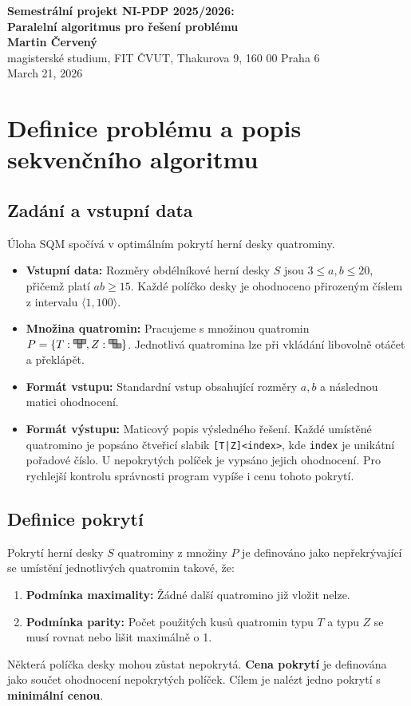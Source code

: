 \documentclass[11pt,a4paper]{article}
\newcommand{\quatZ}{\begin{tikzpicture}[scale=0.13,baseline=0pt]
    \foreach \x/\y in {0/1, 1/1, 1/0, 2/0} 
        \draw[fill=gray!70] (\x,\y) rectangle (\x+1,\y+1);
\end{tikzpicture}}
\newcommand{\quatT}{\begin{tikzpicture}[scale=0.13,baseline=0pt]
    \foreach \x/\y in {0/1, 1/1, 2/1, 1/0} 
        \draw[fill=gray!70] (\x,\y) rectangle (\x+1,\y+1);
\end{tikzpicture}}
\begin{document}
\begin{center}
    \textbf{Semestrální projekt NI-PDP 2025/2026:} \\[0.5em]
    \textbf{Paralelní algoritmus pro řešení problému} \\[1.5em]
    \textbf{Martin Červený} \\
    magisterské studium, FIT ČVUT, Thakurova 9, 160 00 Praha 6 \\
    March 21, 2026
\end{center}

\section{Definice problému a popis sekvenčního algoritmu}
\subsection{Zadání a vstupní data}
Úloha SQM spočívá v optimálním pokrytí herní desky quatrominy.
\begin{itemize}
    \item \textbf{Vstupní data:} Rozměry obdélníkové herní desky $S$ jsou $3 \le a, b \le 20$, přičemž platí $ab \ge 15$. Každé políčko desky je ohodnoceno přirozeným číslem z intervalu $\langle 1, 100 \rangle$.
    \item \textbf{Množina quatromin:} Pracujeme s množinou quatromin $P = \{T: \quatT, Z: \quatZ \}$. Jednotlivá quatromina lze při vkládání libovolně otáčet a překlápět.
    \item \textbf{Formát vstupu:} Standardní vstup obsahující rozměry $a, b$ a následnou matici ohodnocení.
    \item \textbf{Formát výstupu:} Maticový popis výsledného řešení. Každé umístěné quatromino je popsáno čtveřicí slabik \texttt{[T|Z]<index>}, kde \texttt{index} je unikátní pořadové číslo. U nepokrytých políček je vypsáno jejich ohodnocení. Pro rychlejší kontrolu správnosti program vypíše i cenu tohoto pokrytí.
\end{itemize}

\subsection{Definice pokrytí}
Pokrytí herní desky $S$ quatrominy z množiny $P$ je definováno jako nepřekrývající se umístění jednotlivých quatromin takové, že:
\begin{enumerate}
    \item \textbf{Podmínka maximality:} Žádné další quatromino již vložit nelze.
    \item \textbf{Podmínka parity:} Počet použitých kusů quatromin typu $T$ a typu $Z$ se musí rovnat nebo lišit maximálně o 1.
\end{enumerate}
Některá políčka desky mohou zůstat nepokrytá. \textbf{Cena pokrytí} je definována jako součet ohodnocení nepokrytých políček. Cílem je nalézt jedno pokrytí s \textbf{minimální cenou}.
\end{document}
